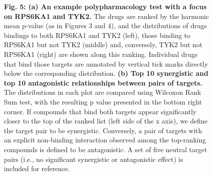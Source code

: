 \documentclass{article}
\begin{document}
\begin{figure}
  \caption{\textbf{Fig. 5: (a) An example polypharmacology test with a focus on RPS6KA1 and TYK2.} The drugs are ranked by the harmonic mean p-value (as in Figures 3 and 4), and the distributions of drugs bindings to both RPS6KA1 and TYK2 (left), those binding to RPS6KA1 but not TYK2 (middle) and, conversely, TYK2 but not RPS6KA1 (right) are shown along this ranking. Individual drugs that bind those targets are annotated by vertical tick marks directly below the corresponding distribution. \textbf{(b) Top 10 synergistic and top 10 antagonistic relationships between pairs of targets.} The distributions in each plot are compared using Wilcoxon Rank Sum test, with the resulting p value presented in the bottom right corner. If compounds that bind both targets appear significantly closer to the top of the ranked list (left side of the x axis), we define the target pair to be synergistic. Conversely, a pair of targets with an explicit non-binding interaction observed among the top-ranking compounds is defined to be antagonistic. A set of five neutral target pairs (i.e., no significant synergistic or antagonistic effect) is included for reference.}
\end{figure}
\end{document}
